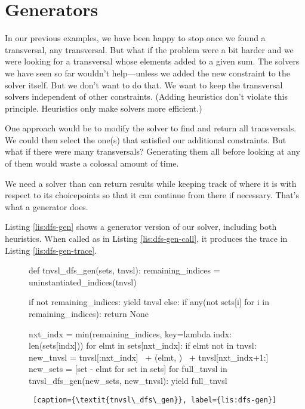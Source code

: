 \section{Generators} \label{sec:generators}
In our previous examples, we have been happy to stop once we found a transversal,  any transversal. But what if the problem were a bit harder and we were looking for a transversal whose elements added to a given sum. The solvers we have seen so far wouldn't help---unless we added the new constraint to the solver itself. But we don't want to do that. We want to keep the transversal solvers independent of other constraints. (Adding heuristics don't violate this principle. Heuristics only make solvers more efficient.)

One approach would be to modify the solver to find and return all transversals. We could then select the one(s) that satisfied our additional constraints. But what if there were many transversals? Generating them all before looking at any of them would waste a colossal amount of time. 

We need a solver than can return results while keeping track of where it is with respect to its choicepoints so that it can continue from there if necessary. That's what a generator does. 

Listing \ref{lis:dfs-gen} shows a generator version of our solver, including both heuristics. When called as in Listing \ref{lis:dfs-gen-call}, it produces the trace in Listing \ref{lis:dfs-gen-trace}. 

\begin{figure}[htb]
    \centering
\begin{minipage}[c]{0.45\textwidth}
\begin{python1}  
def tnvsl_dfs_gen(sets, tnvsl):
  remaining_indices = uninstantiated_indices(tnvsl)

  if not remaining_indices: yield tnvsl
  else:
    if any(not sets[i] for i in remaining_indices):
      return None
      
    nxt_indx = min(remaining_indices,
                   key=lambda indx: len(sets[indx]))
    for elmt in sets[nxt_indx]:
      if elmt not in tnvsl:
        new_tnvsl = tnvsl[:nxt_indx] \
                    + (elmt, ) \
                    + tnvsl[nxt_indx+1:]
        new_sets = [set - {elmt} for set in sets]
        for full_tnvsl in tnvsl_dfs_gen(new_sets, 
                                        new_tnvsl):
          yield full_tnvsl
\end{python1}\linv
\begin{lstlisting} [caption={\textit{tnvsl\_dfs\_gen}}, label={lis:dfs-gen}]
\end{lstlisting}
\end{minipage}\linv
\end{figure}


